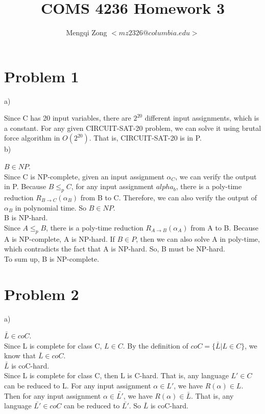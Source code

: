 \documentclass[12pt]{article}
\title{COMS 4236 Homework 3}
\author{Mengqi Zong $<mz2326@columbia.edu>$}
\begin{document}
\maketitle

\setlength{\parindent}{0in}

\section*{Problem 1}

a)

Since C has 20 input variables, there are $2^{20}$ different input
assignments, which is a constant. For any given CIRCUIT-SAT-20
problem, we can solve it using brutal force algorithm in
$O(2^{20})$. That is, CIRCUIT-SAT-20 is in P. \\

b)

$B \in NP$. \\

Since C is NP-complete, given an input assignment $\alpha_C$, we can
verify the output in P. Because $B \le_p C$, for any input assignment
$alpha_b$, there is a poly-time reduction $R_{B \to C}(\alpha_B)$ from B to
C. Therefore, we can also verify the output of $\alpha_B$ in
polynomial time. So $B \in NP$. \\

B is NP-hard. \\

Since $A \le_p B$, there is a poly-time reduction $R_{A \to
  B}(\alpha_A)$ from A to B. Because A is NP-complete, A is
NP-hard. If $B \in P$, then we can also solve A in poly-time, which 
contradicts the fact that A is NP-hard. So, B must be NP-hard. \\

To sum up, B is NP-complete.

\section*{Problem 2}

a)

$\bar {L} \in coC$. \\

Since L is complete for class C, $L \in C$. By the definition of $coC
= \{ \bar {L} | L \in C \}$, we know that $\bar {L} \in coC$. \\

$\bar {L}$ is coC-hard. \\

Since L is complete for class C, then L is C-hard. That is, any
language $L' \in C$ can be reduced to L. For any input assignment
$\alpha \in L'$, we have $R(\alpha) \in L$. Then for any input
assignment $\alpha \in \bar {L'}$, we have $R(\alpha) \in \bar
{L}$. That is, any language $\bar {L'} \in coC$ can be reduced to $\bar
{L'}$. So $\bar {L}$ is coC-hard. \\ 
\end{document}
